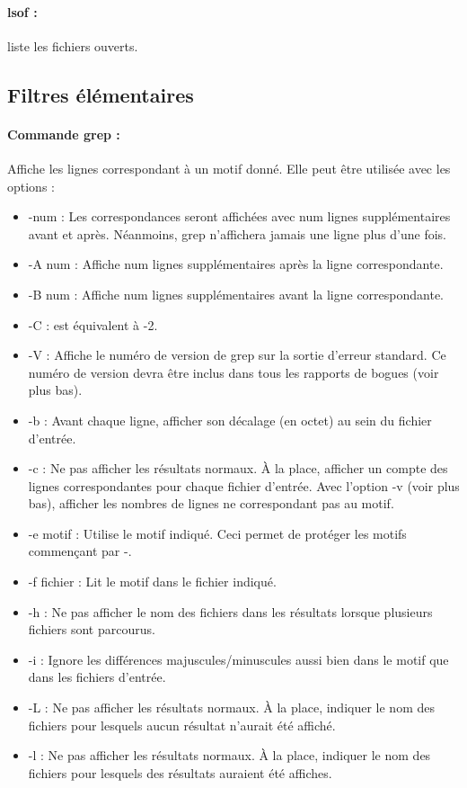 \documentclass{article}[12pt]
\begin{document}
\paragraph{lsof : } liste les fichiers ouverts.
\subsection{Filtres élémentaires}
\paragraph{Commande grep : } Affiche les lignes correspondant à un motif donné. Elle peut être utilisée avec les options :
\begin{itemize}
\item -num : Les correspondances seront affichées avec num lignes supplémentaires avant et après. Néanmoins, grep n'affichera jamais une ligne plus d'une fois.
\item -A num : Affiche num lignes supplémentaires après la ligne correspondante.
\item -B num : Affiche num lignes supplémentaires avant la ligne correspondante.
\item -C : est équivalent à -2.
\item -V : Affiche le numéro de version de grep sur la sortie d'erreur standard. Ce numéro de version devra être inclus dans tous les rapports de bogues (voir plus bas).
\item -b : Avant chaque ligne, afficher son décalage (en octet) au sein du fichier d'entrée.
\item -c : Ne pas afficher les résultats normaux. À la place, afficher un compte des lignes correspondantes pour chaque fichier d'entrée. Avec l'option -v (voir plus bas), afficher les nombres de lignes ne correspondant pas au motif.
\item -e motif : Utilise le motif indiqué. Ceci permet de protéger les motifs commençant par -.
\item -f fichier : Lit le motif dans le fichier indiqué.
\item -h : Ne pas afficher le nom des fichiers dans les résultats lorsque plusieurs fichiers sont parcourus.
\item -i : Ignore les différences majuscules/minuscules aussi bien dans le motif que dans les fichiers d'entrée.
\item -L : Ne pas afficher les résultats normaux. À la place, indiquer le nom des fichiers pour lesquels aucun résultat n'aurait été affiché.
\item -l : Ne pas afficher les résultats normaux. À la place, indiquer le nom des fichiers pour lesquels des résultats auraient été affiches.

\end{itemize}
\end{document}
